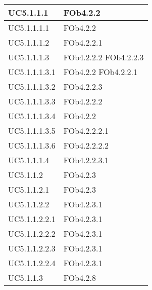 \begin{longtable}{|l|l|}
\hline
		UC5.1.1.1 & FOb4.2.2 \linebreak   \\
\hline
		UC5.1.1.1.1 & FOb4.2.2 \linebreak   \\
\hline
		UC5.1.1.1.2 & FOb4.2.2.1 \linebreak   \\
\hline
		UC5.1.1.1.3 & FOb4.2.2.2 \linebreak  FOb4.2.2.3 \linebreak   \\
\hline
		UC5.1.1.1.3.1 & FOb4.2.2 \linebreak  FOb4.2.2.1 \linebreak   \\
\hline
		UC5.1.1.1.3.2 & FOb4.2.2.3 \linebreak   \\
\hline
		UC5.1.1.1.3.3 & FOb4.2.2.2 \linebreak   \\
\hline
		UC5.1.1.1.3.4 & FOb4.2.2 \linebreak   \\
\hline
		UC5.1.1.1.3.5 & FOb4.2.2.2.1 \linebreak   \\
\hline
		UC5.1.1.1.3.6 & FOb4.2.2.2.2 \linebreak   \\
\hline
		UC5.1.1.1.4 & FOb4.2.2.3.1 \linebreak   \\
\hline
		UC5.1.1.2 & FOb4.2.3 \linebreak   \\
\hline
		UC5.1.1.2.1 & FOb4.2.3 \linebreak   \\
\hline
		UC5.1.1.2.2 & FOb4.2.3.1 \linebreak   \\
\hline
		UC5.1.1.2.2.1 & FOb4.2.3.1 \linebreak   \\
\hline
		UC5.1.1.2.2.2 & FOb4.2.3.1 \linebreak   \\
\hline
		UC5.1.1.2.2.3 & FOb4.2.3.1 \linebreak   \\
\hline
		UC5.1.1.2.2.4 & FOb4.2.3.1 \linebreak   \\
\hline
		UC5.1.1.3 & FOb4.2.8 \linebreak   \\

\end{longtable}
